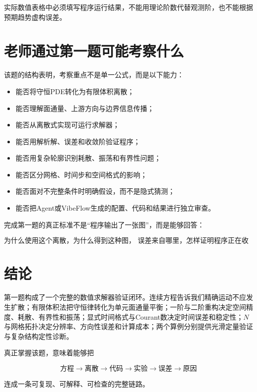 \documentclass[UTF8,12pt,a4paper,fontset=fandol]{ctexart}
\numberwithin{equation}{section}
\begin{document}
实际数值表格中必须填写程序运行结果，不能用理论阶数代替观测阶，也不能根据预期趋势虚构误差。

\section{老师通过第一题可能考察什么}

该题的结构表明，考察重点不是单一公式，而是以下能力：

\begin{itemize}
  \item 能否将守恒PDE转化为有限体积离散；
  \item 能否理解面通量、上游方向与边界信息传播；
  \item 能否从离散式实现可运行求解器；
  \item 能否用解析解、误差和收敛阶验证程序；
  \item 能否用复杂轮廓识别耗散、振荡和有界性问题；
  \item 能否区分网格、时间步和空间格式的影响；
  \item 能否面对不完整条件时明确假设，而不是隐式猜测；
  \item 能否把Agent或VibeFlow生成的配置、代码和结果进行独立审查。
\end{itemize}

完成第一题的真正标准不是“程序输出了一张图”，而是能够回答：

\begin{equation}
\boxed{
\text{为什么使用这个离散，为什么得到这种图，
误差来自哪里，怎样证明程序正在收敛。}
}
\end{equation}

\section{结论}

第一题构成了一个完整的数值求解器验证闭环。连续方程告诉我们精确运动不应发生扩散；有限体积法把守恒律转化为单元面通量平衡；一阶与二阶重构决定空间精度、耗散、有界性和振荡；显式时间格式与Courant数决定时间误差和稳定性；$N$与网格拓扑决定分辨率、方向性误差和计算成本；两个算例分别提供光滑定量验证与复杂结构定性诊断。

真正掌握该题，意味着能够把

\begin{equation}
\boxed{
\text{方程}
\rightarrow
\text{离散}
\rightarrow
\text{代码}
\rightarrow
\text{实验}
\rightarrow
\text{误差}
\rightarrow
\text{原因}
}
\end{equation}

连成一条可复现、可解释、可检查的完整链路。
\end{document}
